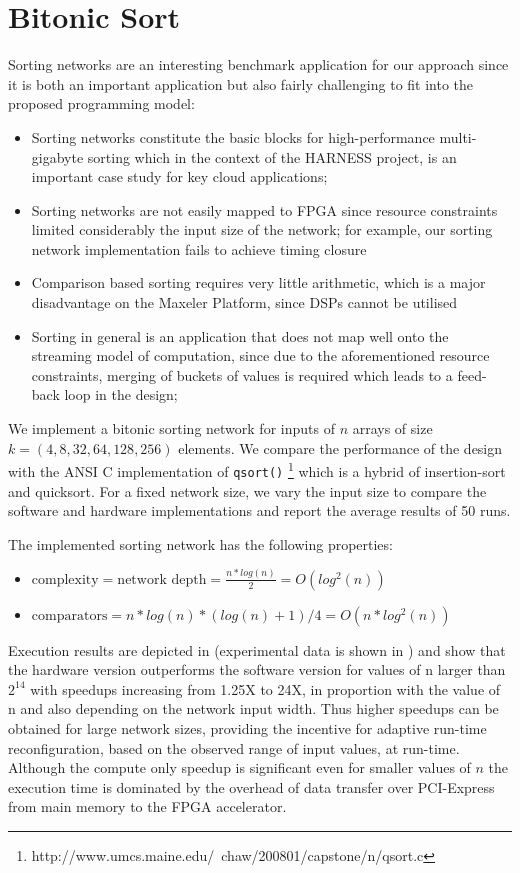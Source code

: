 \section{Bitonic Sort}

Sorting networks \cite{batcher1968sorting} are an interesting
benchmark application for our approach since it is both an important
application but also fairly challenging to fit into the proposed
programming model:
\begin{itemize}
\item Sorting networks constitute the basic blocks for
  high-performance multi-gigabyte sorting which in the context of the
  HARNESS project, is an important case study for key cloud
  applications;
\item Sorting networks are not easily mapped to FPGA since resource
  constraints limited considerably the input size of the network; for
  example, our sorting network implementation fails to achieve timing
  closure
\item Comparison based sorting requires very little arithmetic, which
  is a major disadvantage on the Maxeler Platform, since DSPs cannot
  be utilised
\item Sorting in general is an application that does not map well onto
  the streaming model of computation, since due to the aforementioned
  resource constraints, merging of buckets of values is required which
  leads to a feed-back loop in the design;
\end{itemize}

We implement a bitonic sorting network for inputs of $n$ arrays of
size $k = (4, 8, 32, 64, 128, 256)$ elements. We compare the
performance of the design with the ANSI C implementation of
\texttt{qsort()}
\footnote{http://www.umcs.maine.edu/~chaw/200801/capstone/n/qsort.c}
which is a hybrid of insertion-sort and quicksort. For a fixed network
size, we vary the input size to compare the software and hardware
implementations and report the average results of 50 runs.

The implemented sorting network has the following properties:
\begin{itemize}
\item $\text{complexity} = \text{network depth} = \frac{n * log(n)}{2} = O(log^2(n))  $
\item $\text{comparators} = n * log(n) * (log(n) + 1) / 4 = O(n * log^2(n)) $
\end{itemize}

Execution results are depicted in  (experimental
data is shown in ) and show that the
hardware version outperforms the software version for values of n
larger than $2^{14}$ with speedups increasing from 1.25X to 24X, in
proportion with the value of n and also depending on the network input
width. Thus higher speedups can be obtained for large network sizes,
providing the incentive for adaptive run-time reconfiguration, based
on the observed range of input values, at run-time. Although the
compute only speedup is significant even for smaller values of $n$ the
execution time is dominated by the overhead of data transfer over
PCI-Express from main memory to the FPGA accelerator.

